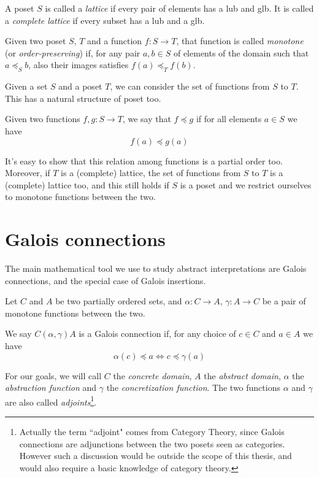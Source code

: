 \begin{definition}[Lattice]
	A poset $S$ is called a \textit{lattice} if every pair of elements has a lub and glb. It is called a \textit{complete lattice} if every subset has a lub and a glb.
\end{definition}

\begin{definition}
	Given two poset $S$, $T$ and a function $f : S \rightarrow T$, that function is called \textit{monotone} (or \textit{order-preserving}) if, for any pair $a, b \in S$ of elements of the domain such that $a \preceq_S b$, also their images satisfies $f(a) \preceq_T f(b)$.
\end{definition}

Given a set $S$ and a poset $T$, we can consider the set of functions from $S$ to $T$. This has a natural structure of poset too.
\begin{definition}
	Given two functions $f, g: S \rightarrow T$, we say that $f \preceq g$ if for all elements $a \in S$ we have
	\[
	f(a) \preceq g(a)
	\]
\end{definition}
It's easy to show that this relation among functions is a partial order too. Moreover, if $T$ is a (complete) lattice, the set of functions from $S$ to $T$ is a (complete) lattice too, and this still holds if $S$ is a poset and we restrict ourselves to monotone functions between the two.

\section{Galois connections}
The main mathematical tool we use to study abstract interpretations are Galois connections, and the special case of Galois insertions.

\begin{definition}\label{ch2:def:gc}
	Let $C$ and $A$ be two partially ordered sets, and $\alpha : C \rightarrow A$, $\gamma : A \rightarrow C$ be a pair of monotone functions between the two.
	
	We say $C (\alpha, \gamma) A$ is a Galois connection if, for any choice of $c \in C$ and $a \in A$ we have
	\[
	\alpha(c) \preceq a \iff c \preceq \gamma(a)
	\]
\end{definition}

For our goals, we will call $C$ the \textit{concrete domain}, $A$ the \textit{abstract domain}, $\alpha$ the \textit{abstraction function} and $\gamma$ the \textit{concretization function}. The two functions $\alpha$ and $\gamma$ are also called \textit{adjoints}\footnote{Actually the term ``adjoint" comes from Category Theory, since Galois connections are adjunctions between the two posets seen as categories. However such a discussion would be outside the scope of this thesis, and would also require a basic knowledge of category theory.}.

